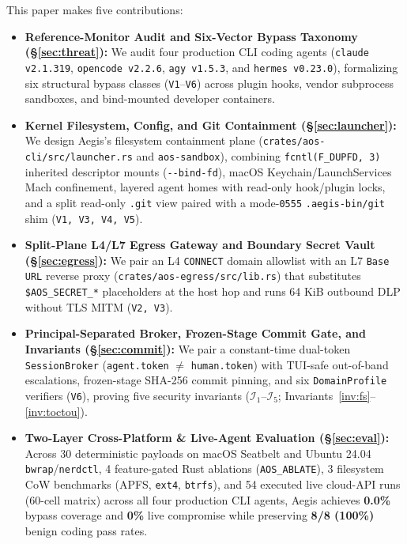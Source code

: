 \documentclass[10pt,twocolumn]{article}
\begin{document}
This paper makes five contributions:
\begin{itemize}
    \item \textbf{Reference-Monitor Audit and Six-Vector Bypass Taxonomy (\S\ref{sec:threat}):} We audit four production CLI coding agents (\texttt{claude v2.1.319}, \texttt{opencode v2.2.6}, \texttt{agy v1.5.3}, and \texttt{hermes v0.23.0}), formalizing six structural bypass classes (\texttt{V1}--\texttt{V6}) across plugin hooks, vendor subprocess sandboxes, and bind-mounted developer containers.
    \item \textbf{Kernel Filesystem, Config, and Git Containment (\S\ref{sec:launcher}):} We design Aegis's filesystem containment plane (\texttt{crates/\allowbreak aos-cli/\allowbreak src/\allowbreak launcher.rs} and \texttt{aos-sandbox}), combining \texttt{fcntl(F\_DUPFD, 3)} inherited descriptor mounts (\texttt{-\/-bind-fd}), macOS Keychain/LaunchServices Mach confinement, layered agent homes with read-only hook/plugin locks, and a split read-only \texttt{.git} view paired with a mode-\texttt{0555} \texttt{.aegis-bin/git} shim (\texttt{V1, V3, V4, V5}).
    \item \textbf{Split-Plane L4/L7 Egress Gateway and Boundary Secret Vault (\S\ref{sec:egress}):} We pair an L4 \texttt{CONNECT} domain allowlist with an L7 \texttt{Base URL} reverse proxy (\texttt{crates/aos-egress/src/lib.rs}) that substitutes \texttt{\$AOS\_SECRET\_*} placeholders at the host hop and runs 64 KiB outbound DLP without TLS MITM (\texttt{V2, V3}).
    \item \textbf{Principal-Separated Broker, Frozen-Stage Commit Gate, and Invariants (\S\ref{sec:commit}):} We pair a constant-time dual-token \texttt{SessionBroker} (\texttt{agent.token} $\neq$ \texttt{human.token}) with TUI-safe out-of-band escalations, frozen-stage SHA-256 commit pinning, and six \texttt{DomainProfile} verifiers (\texttt{V6}), proving five security invariants ($\mathcal{I}_1$--$\mathcal{I}_5$; Invariants~\ref{inv:fs}--\ref{inv:toctou}).
    \item \textbf{Two-Layer Cross-Platform \& Live-Agent Evaluation (\S\ref{sec:eval}):} Across 30 deterministic payloads on macOS Seatbelt and Ubuntu 24.04 \texttt{bwrap}/\texttt{nerdctl}, 4 feature-gated Rust ablations (\texttt{AOS\_ABLATE}), 3 filesystem CoW benchmarks (APFS, \texttt{ext4}, \texttt{btrfs}), and 54 executed live cloud-API runs (60-cell matrix) across all four production CLI agents, Aegis achieves \textbf{0.0\%} bypass coverage and \textbf{0\%} live compromise while preserving \textbf{8/8 (100\%)} benign coding pass rates.
\end{itemize}
\end{document}
